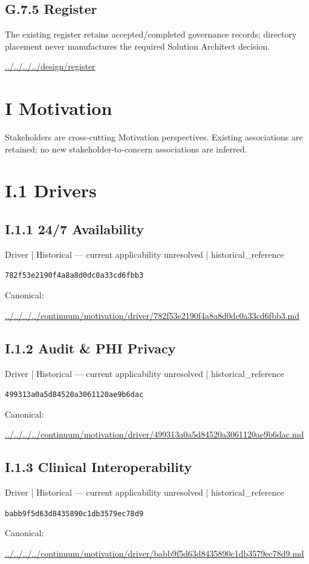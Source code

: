 \documentclass[10pt,a4paper]{article}
\begin{document}
\subsection*{G.7.5 Register}
The existing register retains accepted/completed governance records; directory placement never manufactures the required Solution Architect decision.\par
{\footnotesize\url{../../../../design/register}}\par
\section*{I Motivation}
Stakeholders are cross-cutting Motivation perspectives. Existing associations are retained; no new stakeholder-to-concern associations are inferred.\par
\section*{I.1 Drivers}
\subsection*{I.1.1 24/7 Availability}
{\small Driver | Historical — current applicability unresolved | historical\_reference}\par
\texttt{782f53e2190f4a8a8d0dc0a33cd6fbb3}\par
Canonical: \par
{\footnotesize\url{../../../../continuum/motivation/driver/782f53e2190f4a8a8d0dc0a33cd6fbb3.md}}\par
\subsection*{I.1.2 Audit \& PHI Privacy}
{\small Driver | Historical — current applicability unresolved | historical\_reference}\par
\texttt{499313a0a5d84520a3061120ae9b6dac}\par
Canonical: \par
{\footnotesize\url{../../../../continuum/motivation/driver/499313a0a5d84520a3061120ae9b6dac.md}}\par
\subsection*{I.1.3 Clinical Interoperability}
{\small Driver | Historical — current applicability unresolved | historical\_reference}\par
\texttt{babb9f5d63d8435890c1db3579ec78d9}\par
Canonical: \par
{\footnotesize\url{../../../../continuum/motivation/driver/babb9f5d63d8435890c1db3579ec78d9.md}}\par
\end{document}
